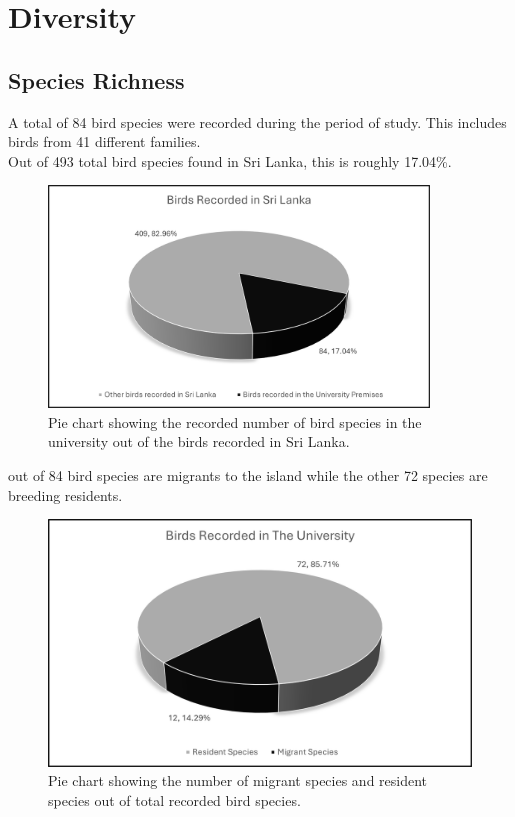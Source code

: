 \chapter{Diversity}
\label{cp:Diversity}

\section{Species Richness}
A total of 84 bird species were recorded during the period of study. This includes birds from 41 different families.\\
Out of 493 total bird species found in Sri Lanka, this is roughly 17.04\%.

\begin{figure}[!htpb]
    \centering
    \includegraphics[width=0.9\textwidth]{Figures/pieChart1.png}
    \caption[]{Pie chart showing the recorded number of bird species in the university out of the birds recorded in Sri Lanka.}
    \label{fig:figure-01}
\end{figure}
 out of 84 bird species are migrants to the island while the other 72 species are breeding residents. 

\begin{figure}[!htpb]
    \centering
    \includegraphics[width=\linewidth]{Figures/pieChart2.png}
    \caption[]{Pie chart showing the number of migrant species and resident species out of total recorded bird species.}
    \label{fig:figure-01}
\end{figure}

